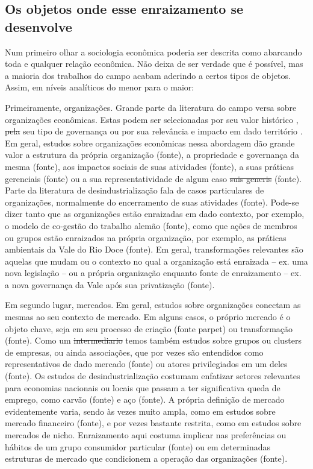 \subsection{Os objetos onde esse enraizamento se desenvolve}
Num primeiro olhar a sociologia econômica poderia ser descrita como
abarcando toda e qualquer relação econômica. Não deixa de ser verdade
que é possível, mas a maioria dos trabalhos do campo acabam aderindo
a certos tipos de objetos. Assim, em níveis analíticos do menor para o maior:

Primeiramente, organizações. Grande parte da literatura do campo versa sobre 
organizações econômicas. Estas podem ser selecionadas por seu valor
histórico , \sout{pela} seu tipo de governança  ou
por sua relevância e impacto em dado território . Em
geral, estudos sobre organizações econômicas nessa abordagem dão grande valor a estrutura da própria organização (fonte), a propriedade e governança da mesma (fonte), aos impactos sociais de suas atividades (fonte), a suas práticas gerenciais (fonte) ou a sua representatividade de algum caso \sout{suis generis} (fonte). Parte da literatura de desindustrialização fala de casos particulares de organizações, normalmente do encerramento de suas atividades (fonte). Pode-se dizer tanto que as organizações estão enraizadas em dado contexto, por exemplo, o modelo de co-gestão do trabalho alemão (fonte), como que ações de membros ou grupos estão enraizados na própria organização, por exemplo, as práticas ambientais da Vale do Rio Doce (fonte). Em geral, transformações relevantes são aquelas que mudam ou o contexto no qual a organização está enraizada -- ex. uma nova legislação -- ou a própria organização enquanto fonte de enraizamento -- ex. a nova governança da Vale após sua privatização (fonte).

Em segundo lugar, mercados. Em geral, estudos sobre organizações conectam as mesmas ao seu contexto de mercado. Em alguns casos, o próprio mercado é o objeto chave, seja em seu processo de criação (fonte parpet) ou transformação (fonte). Como um \sout{intermediario} temos também estudos sobre grupos ou clusters de empresas, ou ainda associações, que por vezes são entendidos como representativos de dado mercado (fonte) ou atores privilegiados em um deles (fonte). Os estudos de desindustrialização costumam enfatizar setores relevantes para economias nacionais ou locais que passam a ter significativa queda de emprego, como carvão (fonte) e aço (fonte). A própria definição de mercado evidentemente varia, sendo às vezes muito ampla, como em estudos sobre mercado financeiro (fonte), e por vezes bastante restrita, como em estudos sobre mercados de nicho. Enraizamento aqui costuma implicar nas preferências ou hábitos de um grupo consumidor particular (fonte) ou em determinadas estruturas de mercado que condicionem a operação das organizações (fonte).

